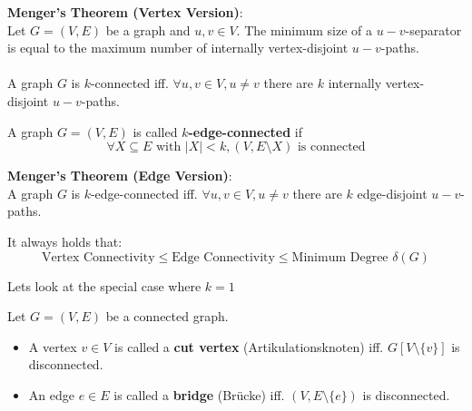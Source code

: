             \begin{theorem}

\textbf{Menger's Theorem (Vertex Version)}:\\

                Let $G = (V, E)$ be a graph and $u, v \in V$. The minimum size of a $u-v$-separator is equal to the
                maximum number of internally vertex-disjoint $u-v$-paths.
                \\
\\

                A graph $G$ is $k$-connected iff. $\forall u, v \in V, u \neq v$ there are $k$ internally
                vertex-disjoint $u-v$-paths.
            
\end{theorem}

\begin{definition}

                A graph $G = (V, E)$ is called \textbf{$k$-edge-connected} if
                $$\forall X \subseteq E \text{ with } |X| \lt k, (V, E \setminus X) \text{ is connected}$$
            
\end{definition}

\begin{theorem}

\textbf{Menger's Theorem (Edge Version)}:\\

                A graph $G$ is $k$-edge-connected iff. $\forall u, v \in V, u \neq v$ there are $k$ edge-disjoint
                $u-v$-paths.
            
\end{theorem}

\begin{theorem}

                It always holds that:
                $$\text{Vertex Connectivity} \le \text{Edge Connectivity} \le \text{Minimum Degree } \delta(G)$$
            
\end{theorem}

            Lets look at the special case where $k=1$

            \begin{definition}

                Let $G = (V, E)$ be a connected graph.
                \begin{itemize}
    \item A vertex $v \in V$ is called a \textbf{cut vertex} (Artikulationsknoten) iff. $G[V \setminus
                        \{v\}]$ is disconnected.
    \item An edge $e \in E$ is called a \textbf{bridge} (Brücke) iff. $(V, E \setminus \{e\})$ is
                        disconnected.
\end{itemize}

\end{definition}


